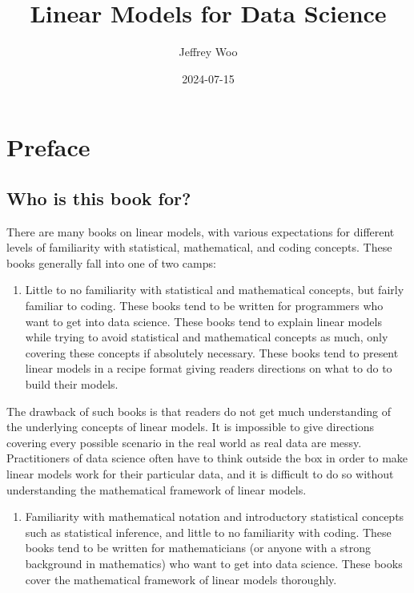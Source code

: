 \documentclass[
]{book}
\title{Linear Models for Data Science}
\author{Jeffrey Woo}
\date{2024-07-15}
\providecommand{\tightlist}{%
  \setlength{\itemsep}{0pt}\setlength{\parskip}{0pt}}
\begin{document}
\maketitle

{
\setcounter{tocdepth}{1}
\tableofcontents
}
\hypertarget{preface}{%
\chapter*{Preface}\label{preface}}

\hypertarget{who-is-this-book-for}{%
\section*{Who is this book for?}\label{who-is-this-book-for}}

There are many books on linear models, with various expectations for different levels of familiarity with statistical, mathematical, and coding concepts. These books generally fall into one of two camps:

\begin{enumerate}
\def\labelenumi{\arabic{enumi}.}
\tightlist
\item
  Little to no familiarity with statistical and mathematical concepts, but fairly familiar to coding. These books tend to be written for programmers who want to get into data science. These books tend to explain linear models while trying to avoid statistical and mathematical concepts as much, only covering these concepts if absolutely necessary. These books tend to present linear models in a recipe format giving readers directions on what to do to build their models.
\end{enumerate}

The drawback of such books is that readers do not get much understanding of the underlying concepts of linear models. It is impossible to give directions covering every possible scenario in the real world as real data are messy. Practitioners of data science often have to think outside the box in order to make linear models work for their particular data, and it is difficult to do so without understanding the mathematical framework of linear models.

\begin{enumerate}
\def\labelenumi{\arabic{enumi}.}
\setcounter{enumi}{1}
\tightlist
\item
  Familiarity with mathematical notation and introductory statistical concepts such as statistical inference, and little to no familiarity with coding. These books tend to be written for mathematicians (or anyone with a strong background in mathematics) who want to get into data science. These books cover the mathematical framework of linear models thoroughly.
\end{enumerate}
\end{document}
